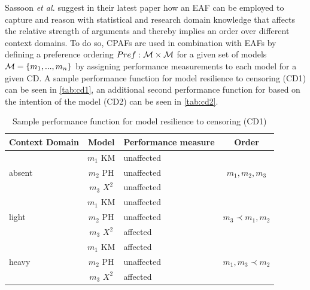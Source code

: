 Sassoon \textit{et al.} suggest in their latest paper \cite{sassoon2016CD} how an \gls{EAF} can be employed to capture and reason with statistical and research domain knowledge that affects the relative strength of arguments and thereby implies an order over different context domains. To do so, \glspl{CPAF} are used in combination with \glspl{EAF} by defining a preference ordering $Pref : \mathcal{M} \times \mathcal{M}$ for a given set of models $\mathcal{M} = \{m_1, ..., m_n\}$ by assigning performance measurements to each model for a given \gls{CD}. A sample performance function for model resilience to censoring (CD1) can be seen in \autoref{tab:cd1}, an additional second performance function for based on the intention of the model (CD2) can be seen in \autoref{tab:cd2}.
\begin{table}[t]
	\centering
	\begin{tabular}{|l|c|l|c|}
	\hline
	Context Domain 			& Model 			& Performance measure & Order\\
	\hline\hline
	\multirow{3}{*}{absent} & $m_1$ KM 		& unaffected		& 	\multirow{3}{*}{$m_1, m_2, m_3$}\\
							& $m_2$ PH		& unaffected		&\\
							& $m_3$ $X^2$	& unaffected		&\\
	\hline
	\multirow{3}{*}{light} 	& $m_1$ KM 		& unaffected		& \multirow{3}{*}{$m_3 \prec m_1, m_2$}\\
							& $m_2$ PH		& unaffected		&\\
							& $m_3$ $X^2$	& affected		&\\
	\hline
	\multirow{3}{*}{heavy} 	& $m_1$ KM 		& affected		& \multirow{3}{*}{$m_1, m_3 \prec m_2$}\\
							& $m_2$ PH		& unaffected		&\\
							& $m_3$ $X^2$	& affected		&\\
	\hline
	\end{tabular}
	\caption{Sample performance function for model resilience to censoring (CD1) \cite{sassoon2016CD}}
	\label{tab:cd1}
\end{table}


